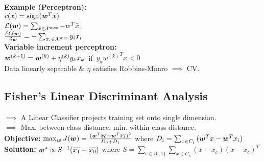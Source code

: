 
\textbf{Example (Perceptron):}\\
$c(x) = \mathrm{sign}({\bm{w}}^Tx)$\\
$\mathcal{L}({\bm{w}})=\sum_{\tilde{x}\in\mathcal{X}^\text{msc}}-w^T\tilde{x}$,\\
$\frac{\delta\mathcal{L}({\bm{w}})}{\delta{\bm{w}}} = -\sum_{x_i\in\mathcal{X}^\text{msc}}y_ix_i$\\
\textbf{Variable increment perceptron:}\\
\mbox{\hspace{-0.5em}${\bm{w}}^{(k+1)}={\bm{w}}^{(k)}+\eta^{(k)}y_kx_k $ if $y_k{w^{(k)}}^Tx < 0$}\\
Data linearly separable \& $\eta$ satisfies Robbins-Monro $\implies$ CV. 
\subsection*{Fisher's Linear Discriminant Analysis}
$\implies$ A Linear Classifier projects training set onto
single dimension.\\
$\implies$ Max. between-class distance, min. within-class distance.\\
\textbf{Objective:} \mbox{$\max_{\bm{w}} J({\bm{w}}) = \frac{({\bm{w}}^T\overline{x_0} - {\bm{w}}^T\overline{x_1})^2}{D_0+D_1}$}
where $D_i = \sum_{x\in C_i}{({\bm{w}}^Tx - {\bm{w}}^Tx_i)}$\\
\textbf{Solution:}
${\bm{w}}^* \propto S^{-1}(\overline{x_1}-\overline{x_0})$ where $S = \sum_{c\in\{0,1\}}\sum_{x\in C_c}(x-\bar{x_c})(x-\bar{x_c})^T$

